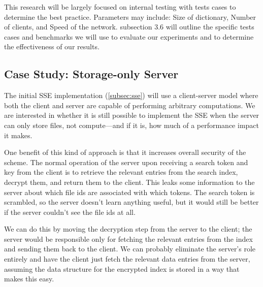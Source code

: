 This research will be largely focused on internal testing with tests cases to determine the best practice. Parameters may include: Size of dictionary, Number of clients, and Speed of the network. subsection 3.6 will outline the specific tests cases and benchmarks we will use to evaluate our experiments and to determine the effectiveness of our results. 

\subsection {Case Study: Storage-only Server}
\label{subsec:dumbserver}




The initial SSE implementation (\ref{subsec:sse}) will use a client-server model where both the client and server are capable of performing arbitrary computations.
We are interested in whether it is still possible to implement the SSE when the server can only store files, not compute---and if it is, how much of a performance impact it makes.

One benefit of this kind of approach is that it increases overall security of the scheme.
The normal operation of the server upon receiving a search token and key from the client is to retrieve the relevant entries from the search index, decrypt them, and return them to the client.
This leaks some information to the server about which file ids are associated with which tokens.
The search token is scrambled, so the server doesn't learn anything useful, but it would still be better if the server couldn't see the file ids at all. 

We can do this by moving the decryption step from the server to the client; 
the server would be responsible only for fetching the relevant entries from the index and sending them back to the client.
We can probably eliminate the server's role entirely and have the client just fetch the relevant data entries from the server, assuming the data structure for the encrypted index is stored in a way that makes this easy.


